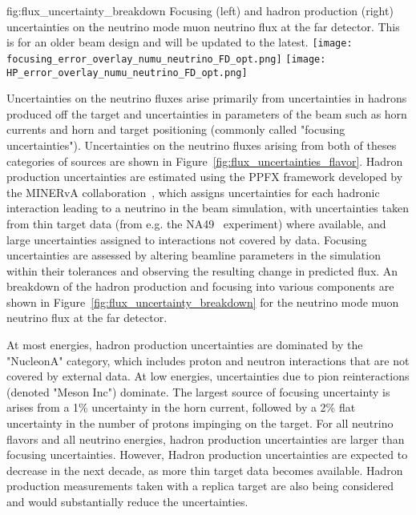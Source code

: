 \begin{dunefigure}{fig:flux_uncertainty_breakdown}
{Focusing (left) and hadron production (right) uncertainties on the neutrino mode muon neutrino flux at the far detector.  This is for an older beam design and will be updated to the latest.  }
\texttt{[image: focusing\_error\_overlay\_numu\_neutrino\_FD\_opt.png]}
    \texttt{[image: HP\_error\_overlay\_numu\_neutrino\_FD\_opt.png]}\end{dunefigure}

Uncertainties on the neutrino fluxes arise primarily from uncertainties in hadrons produced off the target and uncertainties in parameters of the beam such as horn currents and horn and target positioning (commonly called "focusing uncertainties").  Uncertainties on the neutrino fluxes arising from both of theses categories of sources are shown in Figure~\ref{fig:flux_uncertainties_flavor}.  Hadron production uncertainties are estimated using the PPFX framework developed by the MINERvA collaboration~\cite{Aliaga:2016oaz, AliagaSoplin:2016shs}, which assigns uncertainties for each hadronic interaction leading to a neutrino in the beam simulation, with uncertainties taken from thin target data (from e.g. the NA49~\cite{NA49} experiment) where available, and large uncertainties assigned to interactions not covered by data.  Focusing uncertainties are assessed by altering beamline parameters in the simulation within their tolerances and observing the resulting change in predicted flux.  An breakdown of the hadron production and focusing into various components are shown in Figure~\ref{fig:flux_uncertainty_breakdown} for the neutrino mode muon neutrino flux at the far detector.    

At most energies, hadron production uncertainties are dominated by the "NucleonA" category, which includes proton and neutron interactions that are not covered by external data.  At low energies, uncertainties due to pion reinteractions (denoted "Meson Inc") dominate.   The largest source of focusing uncertainty is arises from a 1\% uncertainty in the horn current, followed by a 2\% flat uncertainty in the number of protons impinging on the target.   For all neutrino flavors and all neutrino energies, hadron production uncertainties are larger than focusing uncertainties.  However, Hadron production uncertainties are expected to decrease in the next decade, as more thin target data becomes available.  Hadron production measurements taken with a replica target are also being considered and would substantially reduce the uncertainties.  


